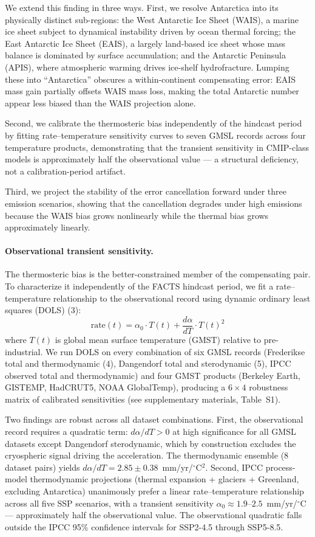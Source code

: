 \documentclass[11pt]{article}
\begin{document}
We extend this finding in three ways.  First, we resolve Antarctica into its physically distinct sub-regions: the West Antarctic Ice Sheet (WAIS), a marine ice sheet subject to dynamical instability driven by ocean thermal forcing; the East Antarctic Ice Sheet (EAIS), a largely land-based ice sheet whose mass balance is dominated by surface accumulation; and the Antarctic Peninsula (APIS), where atmospheric warming drives ice-shelf hydrofracture.  Lumping these into ``Antarctica'' obscures a within-continent compensating error: EAIS mass gain partially offsets WAIS mass loss, making the total Antarctic number appear less biased than the WAIS projection alone.

Second, we calibrate the thermosteric bias independently of the hindcast period by fitting rate--temperature sensitivity curves to seven GMSL records across four temperature products, demonstrating that the transient sensitivity in CMIP-class models is approximately half the observational value --- a structural deficiency, not a calibration-period artifact.

Third, we project the stability of the error cancellation forward under three emission scenarios, showing that the cancellation degrades under high emissions because the WAIS bias grows nonlinearly while the thermal bias grows approximately linearly.


\paragraph{Observational transient sensitivity.}

The thermosteric bias is the better-constrained member of the compensating pair.  To characterize it independently of the FACTS hindcast period, we fit a rate--temperature relationship to the observational record using dynamic ordinary least squares (DOLS) (3):
$$\text{rate}(t) = \alpha_0 \cdot T(t) + \frac{d\alpha}{dT} \cdot T(t)^2$$
where $T(t)$ is global mean surface temperature (GMST) relative to pre-industrial.  We run DOLS on every combination of six GMSL records (Frederikse total and thermodynamic (4), Dangendorf total and sterodynamic (5), IPCC observed total and thermodynamic) and four GMST products (Berkeley Earth, GISTEMP, HadCRUT5, NOAA GlobalTemp), producing a $6 \times 4$ robustness matrix of calibrated sensitivities (see supplementary materials, Table~S1).

Two findings are robust across all dataset combinations.  First, the observational record requires a quadratic term: $d\alpha/dT > 0$ at high significance for all GMSL datasets except Dangendorf sterodynamic, which by construction excludes the cryospheric signal driving the acceleration.  The thermodynamic ensemble (8 dataset pairs) yields $d\alpha/dT = 2.85 \pm 0.38$~mm/yr/${}^\circ$C$^2$.  Second, IPCC process-model thermodynamic projections (thermal expansion + glaciers + Greenland, excluding Antarctica) unanimously prefer a linear rate--temperature relationship across all five SSP scenarios, with a transient sensitivity $\alpha_0 \approx 1.9$--$2.5$~mm/yr/${}^\circ$C --- approximately half the observational value.  The observational quadratic falls outside the IPCC 95\% confidence intervals for SSP2-4.5 through SSP5-8.5.
\end{document}
